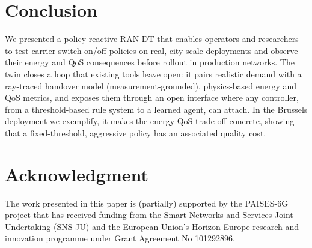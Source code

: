 \documentclass[sigconf, 10pt]{acmart}
\begin{document}
\section{Conclusion}
\label{sec:conclusion}
We presented a policy-reactive \ac{RAN} \ac{DT} that enables operators and researchers to test carrier switch-on/off policies on real, city-scale deployments and observe their energy and \ac{QoS} consequences before rollout in production networks. 
The twin closes a loop that existing tools leave open: it pairs realistic demand with a ray-traced handover model (measurement-grounded), physics-based energy and \ac{QoS} metrics, and exposes them through an open interface where any controller, from a threshold-based rule system to a learned agent, can attach. 
In the Brussels deployment we exemplify, it makes the energy-QoS trade-off concrete, showing that a fixed-threshold, aggressive policy has an associated quality cost.

\section*{Acknowledgment}
The work presented in this paper is (partially) supported by the PAISES-6G project that has received funding from the Smart Networks and Services Joint Undertaking (SNS JU) and the European Union’s Horizon Europe research and innovation programme under Grant Agreement No 101292896.




\end{document}
